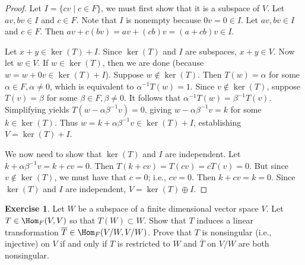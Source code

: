 \documentclass[9pt,twoside,openany]{memoir}
\theoremstyle{plain}
\theoremstyle{definition}
\newtheorem{exercise}{Exercise}
\theoremstyle{remark}
\numberwithin{equation}{section}
\begin{document}
        \begin{proof}
            Let $I = \{cv \mid c \in F\}$, we must first show that it is a subspace of $V$. Let $av, bv \in I$ and $c \in F$. Note that $I$ is nonempty because $0v = 0 \in I$. Let $av,bv \in I$ and $c \in F$. Then $av + c(bv) = av + (cb)v = (a+cb)v \in I$.

            Let $x+y \in \ker{(T)} + I$. Since $\ker{(T)}$ and $I$ are subspaces, $x + y \in V$. Now let $w \in V$. If $w \in \ker{(T)}$, then we are done (because $w = w + 0v \in \ker{(T)} + I$). Suppose $w \not\in \ker{(T)}$. Then $T(w) = \alpha$ for some $\alpha \in F, \alpha \neq 0$, which is equivalent to $\alpha^{-1}T(w) = 1$. Since $v \not\in \ker{(T)}$, suppose $T(v) = \beta$ for some $\beta \in F, \beta \neq 0$. It follows that $\alpha^{-1}T(w) = \beta^{-1}T(v)$. Simplifying yields $T(w - \alpha \beta^{-1}v) = 0$, giving $w - \alpha \beta^{-1}v = k$ for some $k \in \ker{(T)}$. Thus $w = k + \alpha \beta^{-1} v \in \ker{(T)} + I$, establishing $V = \ker{(T)} + I$.

            We now need to show that $\ker{(T)}$ and $I$ are independent. Let $k+\alpha \beta^{-1}v = k+cv = 0$. Then $T(k+cv) = T(cv) = cT(v) = 0$. But since $v \not\in \ker{(T)}$, we must have that $c = 0$; i.e., $cv = 0$. Then $k+cv = k = 0$. Since $\ker{(T)}$ and $I$ are independent, $V = \ker{(T)} \oplus I$.
        \end{proof}
\addtocounter{exercise}{6}
    \begin{exercise}
        Let $W$ be a subspace of a finite dimensional vector space $V$. Let $T \in \Hom_F{(V,V)}$ so that $T(W) \subset W$. Show that $T$ induces a linear transformation $\overline{T} \in \Hom_F{(V/W,V/W)}$. Prove that $T$ is nonsingular (i.e., injective) on $V$ if and only if $T$ is restricted to $W$ and $\overline{T}$ on $V/W$ are both nonsingular.
    \end{exercise}
\end{document}
